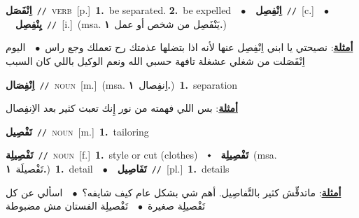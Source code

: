 \documentclass[10pt,a4paper,twoside]{article} %
\begin{document}
\begin{multicols}{2}
{\setlength\topsep{0pt}\textbf{\foreignlanguage{arabic}{اِنْفَصَل}}\ {\color{gray}\texttt{//}\color{black}}\ \textsc{verb}\ [p.]\ \textbf{1.}~be separated.  \textbf{2.}~be expelled\ \ $\bullet$\ \ \setlength\topsep{0pt}\textbf{\foreignlanguage{arabic}{اِنْفِصِل}}\ {\color{gray}\texttt{//}\color{black}}\ [c.]\ \ $\bullet$\ \ \setlength\topsep{0pt}\textbf{\foreignlanguage{arabic}{يِنْفِصِل}}\ {\color{gray}\texttt{//}\color{black}}\ [i.]\ \color{gray}(msa. \foreignlanguage{arabic}{يَنْفَصِل من شخص أو عمل}~\foreignlanguage{arabic}{\textbf{١.}})\color{black}\  \begin{flushright}\color{gray}\foreignlanguage{arabic}{\textbf{\underline{\foreignlanguage{arabic}{أمثلة}}}: نصيحتي يا ابني اِنْفِصِل عنها لأنه اذا بتضلها عذمتك رح تعملك وجع راس\ $\bullet$\ \  اليوم اِنْفَصَلت من شغلي عشغلة تافهة حسبي الله ونعم الوكيل باللي كان السبب}\end{flushright}\color{black}} \vspace{2mm}

{\setlength\topsep{0pt}\textbf{\foreignlanguage{arabic}{اِنْفِصَال}}\ {\color{gray}\texttt{//}\color{black}}\ \textsc{noun}\ [m.]\ \color{gray}(msa. \foreignlanguage{arabic}{اِنفِصال}~\foreignlanguage{arabic}{\textbf{١.}})\color{black}\ \textbf{1.}~separation\  \begin{flushright}\color{gray}\foreignlanguage{arabic}{\textbf{\underline{\foreignlanguage{arabic}{أمثلة}}}: بس اللي فهمته من نور إِنك تعبت كثير بعد الاِنفِصال}\end{flushright}\color{black}} \vspace{2mm}

{\setlength\topsep{0pt}\textbf{\foreignlanguage{arabic}{تَفْصِيل}}\ {\color{gray}\texttt{//}\color{black}}\ \textsc{noun}\ [m.]\ \textbf{1.}~tailoring\ } \vspace{2mm}

{\setlength\topsep{0pt}\textbf{\foreignlanguage{arabic}{تَفْصِيلِة}}\ {\color{gray}\texttt{//}\color{black}}\ \textsc{noun}\ [f.]\ \textbf{1.}~style or cut (clothes)\ \ $\smblkdiamond$\ \ \setlength\topsep{0pt}\textbf{\foreignlanguage{arabic}{تَفْصِيلِة}}\ \color{gray}(msa. \foreignlanguage{arabic}{تَفْصيلَة}~\foreignlanguage{arabic}{\textbf{١.}})\color{black}\ \textbf{1.}~detail\ \ $\bullet$\ \ \setlength\topsep{0pt}\textbf{\foreignlanguage{arabic}{تَفَاصِيل}}\ {\color{gray}\texttt{//}\color{black}}\ [pl.]\ \textbf{1.}~details\  \begin{flushright}\color{gray}\foreignlanguage{arabic}{\textbf{\underline{\foreignlanguage{arabic}{أمثلة}}}: ماتدقِّش كثير بالتَّفاصِيل. أهم شي بشكل عام كيف شايفه؟\ $\bullet$\ \  اسألي عن كل تَفْصيلِة صغيرة\ $\bullet$\ \  تَفْصيلِة الفستان مش مضبوطة}\end{flushright}\color{black}} \vspace{2mm}


\end{multicols}
\end{document}
